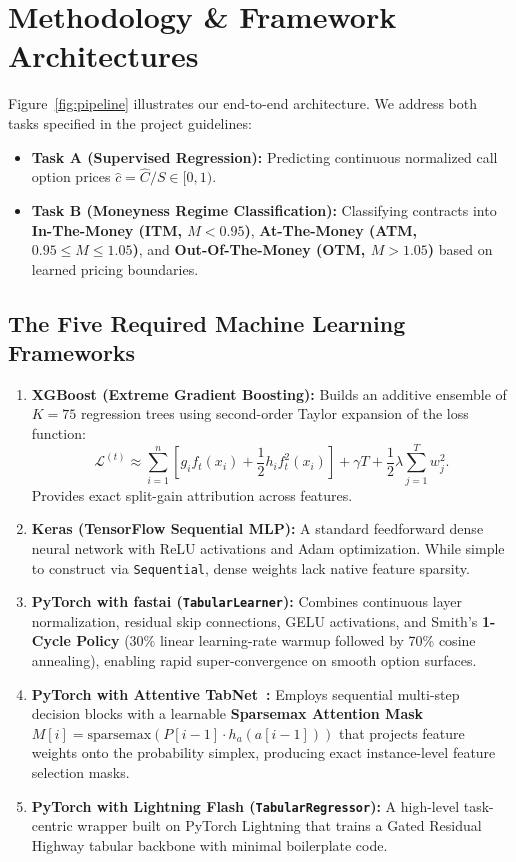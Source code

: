 \documentclass[10pt,twocolumn]{article}
\begin{document}
\section{Methodology \& Framework Architectures}
Figure~\ref{fig:pipeline} illustrates our end-to-end architecture. We address both tasks specified in the project guidelines:
\begin{itemize}
    \item \textbf{Task A (Supervised Regression):} Predicting continuous normalized call option prices $\hat{c} = \hat{C}/S \in [0, 1)$.
    \item \textbf{Task B (Moneyness Regime Classification):} Classifying contracts into \textbf{In-The-Money (ITM, $M < 0.95$)}, \textbf{At-The-Money (ATM, $0.95 \le M \le 1.05$)}, and \textbf{Out-Of-The-Money (OTM, $M > 1.05$)} based on learned pricing boundaries.
\end{itemize}

\subsection{The Five Required Machine Learning Frameworks}
\begin{enumerate}
    \item \textbf{XGBoost (Extreme Gradient Boosting):} Builds an additive ensemble of $K=75$ regression trees using second-order Taylor expansion of the loss function:
    \begin{equation}
        \mathcal{L}^{(t)} \approx \sum_{i=1}^{n} \left[ g_i f_t(x_i) + \frac{1}{2} h_i f_t^2(x_i) \right] + \gamma T + \frac{1}{2}\lambda \sum_{j=1}^{T} w_j^2.
    \end{equation}
    Provides exact split-gain attribution across features.
    \item \textbf{Keras (TensorFlow Sequential MLP):} A standard feedforward dense neural network with ReLU activations and Adam optimization. While simple to construct via \texttt{Sequential}, dense weights lack native feature sparsity.
    \item \textbf{PyTorch with fastai (\texttt{TabularLearner}):} Combines continuous layer normalization, residual skip connections, GELU activations, and Smith's \textbf{1-Cycle Policy} (30\% linear learning-rate warmup followed by 70\% cosine annealing), enabling rapid super-convergence on smooth option surfaces.
    \item \textbf{PyTorch with Attentive TabNet~\cite{arik2021tabnet}:} Employs sequential multi-step decision blocks with a learnable \textbf{Sparsemax Attention Mask} $M[i] = \text{sparsemax}(P[i-1] \cdot h_a(a[i-1]))$ that projects feature weights onto the probability simplex, producing exact instance-level feature selection masks.
    \item \textbf{PyTorch with Lightning Flash (\texttt{TabularRegressor}):} A high-level task-centric wrapper built on PyTorch Lightning that trains a Gated Residual Highway tabular backbone with minimal boilerplate code.
\end{enumerate}
\end{document}
